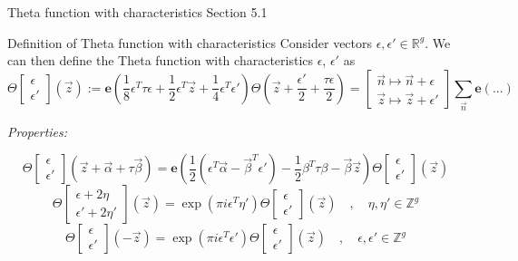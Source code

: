 \documentclass[11pt,aspectratio=169]{beamer}
\newcommand{\ee}[0]{\mathbf{e}}
\begin{document}
\begin{frame}{Theta function with characteristics}{\tiny \cite{Ber06} Section 5.1}
    \begin{block}{Definition of Theta function with characteristics}
        Consider vectors $ \epsilon ,  \epsilon' \in \mathbb R^g$.
        We can then define the Theta function with characteristics $ \epsilon$, $ \epsilon'$ as
        \[\Theta\begin{bmatrix} \epsilon \\  \epsilon'\end{bmatrix}(\vec z) := 
        \ee\left(\frac{1}{8}\epsilon^T \tau \epsilon + \frac{1}{2}\epsilon^T \vec z + \frac{1}{4}\epsilon^T  \epsilon'\right)
        \Theta\left(\vec z + \frac{\epsilon'}{2}+\frac{\tau\epsilon}{2}\right) = \begin{bmatrix}\vec n \mapsto \vec n+\epsilon \\ \vec z \mapsto \vec z + \epsilon' \end{bmatrix} \sum_{\vec n} \ee(...)\] 
    \end{block}
    \emph{Properties:}

    \[\Theta\begin{bmatrix}\epsilon \\ \epsilon'\end{bmatrix}(\vec z + \vec \alpha + \tau \vec \beta) =
    \ee\left(\frac{1}{2}(\epsilon^T \vec \alpha - \vec \beta^T \epsilon') - \frac{1}{2} \beta^T \tau \beta - \vec \beta \vec z\right)
    \Theta\begin{bmatrix}\epsilon \\ \epsilon'\end{bmatrix}(\vec z)\]
    \[\Theta\begin{bmatrix}\epsilon + 2\eta \\ \epsilon' + 2\eta' \end{bmatrix}(\vec z) = \exp(\pi i \epsilon^T \eta')
    \Theta\begin{bmatrix}\epsilon \\ \epsilon'\end{bmatrix}(\vec z) \quad , \quad \eta,\eta' \in \mathbb Z^g\]
    \[\Theta\begin{bmatrix}\epsilon \\ \epsilon'\end{bmatrix}(-\vec z) = \exp(\pi i \epsilon^T \epsilon') \Theta\begin{bmatrix}\epsilon \\ \epsilon'\end{bmatrix}(\vec z) \quad , \quad \epsilon,\epsilon' \in \mathbb Z^g\]
\end{frame}
\end{document}

